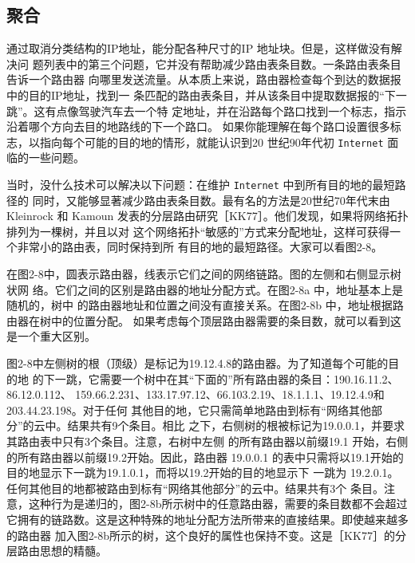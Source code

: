\subsection{聚合}

通过取消分类结构的IP地址，能分配各种尺寸的IP 地址块。但是，这样做没有解决问
题列表中的第三个问题，它并没有帮助减少路由表条目数。一条路由表条目告诉一个路由器
向哪里发送流量。从本质上来说，路由器检查每个到达的数据报中的目的IP地址，找到一
条匹配的路由表条目，并从该条目中提取数据报的“下一跳”。这有点像驾驶汽车去一个特
定地址，并在沿路每个路口找到一个标志，指示沿着哪个方向去目的地路线的下一个路口。
如果你能理解在每个路口设置很多标志，以指向每个可能的目的地的情形，就能认识到20
世纪90年代初 \verb|Internet| 面临的一些问题。

当时，没什么技术可以解决以下问题：在维护 \verb|Internet| 中到所有目的地的最短路径的
同时，又能够显著减少路由表条目数。最有名的方法是20世纪70年代末由 Kleinrock 和
Kamoun 发表的分层路由研究［KK77］。他们发现，如果将网络拓扑排列为一棵树\footnotemark，并且以对
这个网络拓扑“敏感的”方式来分配地址，这样可获得一个非常小的路由表，同时保持到所
有目的地的最短路径。大家可以看图2-8。


在图2-8中，圆表示路由器，线表示它们之间的网络链路。图的左侧和右侧显示树状网
络。它们之间的区别是路由器的地址分配方式。在图2-8a 中，地址基本上是随机的，树中
的路由器地址和位置之间没有直接关系。在图2-8b 中，地址根据路由器在树中的位置分配。
如果考虑每个顶层路由器需要的条目数，就可以看到这是一个重大区别。

图2-8中左侧树的根（顶级）是标记为19.12.4.8的路由器。为了知道每个可能的目的地
的下一跳，它需要一个树中在其“下面的”所有路由器的条目：190.16.11.2、86.12.0.112、
159.66.2.231、133.17.97.12、66.103.2.19、18.1.1.1、19.12.4.9和 203.44.23.198。对于任何
其他目的地，它只需简单地路由到标有“网络其他部分”的云中。结果共有9个条目。相比
之下，右侧树的根被标记为19.0.0.1，并要求其路由表中只有3个条目。注意，右树中左侧
的所有路由器以前缀19.1 开始，右侧的所有路由器以前缀19.2开始。因此，路由器 19.0.0.1
的表中只需将以19.1开始的目的地显示下一跳为19.1.0.1，而将以19.2开始的目的地显示下
一跳为 19.2.0.1。任何其他目的地都被路由到标有“网络其他部分”的云中。结果共有3个
条目。注意，这种行为是递归的，图2-8b所示树中的任意路由器，需要的条目数都不会超过
它拥有的链路数。这是这种特殊的地址分配方法所带来的直接结果。即使越来越多的路由器
加入图2-8b所示的树，这个良好的属性也保持不变。这是［KK77］的分层路由思想的精髓。

